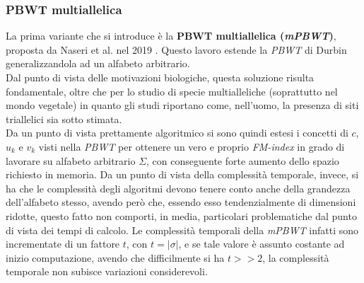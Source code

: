 \subsubsection{PBWT multiallelica}
La prima variante che si introduce è la \textbf{PBWT multiallelica
  (\textit{mPBWT})}, proposta da Naseri et al. nel 2019 \cite{mpbwt}. Questo
lavoro estende la \textit{PBWT} di Durbin generalizzandola ad un alfabeto
arbitrario. \\
Dal punto di vista delle motivazioni biologiche, questa soluzione risulta
fondamentale, oltre che per lo studio di specie multialleliche (soprattutto nel
mondo vegetale) in quanto gli studi riportano come, nell'uomo, la presenza di
siti triallelici sia sotto stimata. \\
Da un punto di vista prettamente algoritmico si sono quindi estesi i concetti di
$c$, $u_k$ e $v_k$ visti nella \textit{PBWT} per ottenere un vero e proprio
\textit{FM-index} in grado di lavorare su alfabeto arbitrario $\Sigma$, con
conseguente forte aumento dello spazio richiesto in memoria. Da un punto di
vista della complessità temporale, invece, si ha che le complessità degli
algoritmi devono tenere conto anche della grandezza dell'alfabeto stesso, avendo
però che, essendo esso tendenzialmente di dimensioni ridotte, questo fatto non
comporti, in media, particolari problematiche dal punto di vista dei tempi di
calcolo. Le complessità temporali della \textit{mPBWT} infatti sono incrementate
di un fattore $t$, con $t=\left|\sigma\right|$, e se tale valore è assunto
costante ad inizio computazione, avendo che difficilmente si ha $t>>2$, la
complessità temporale non subisce variazioni considerevoli.
